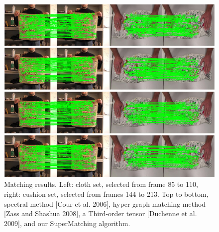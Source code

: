 \begin{figure}
\centering
  \includegraphics[width=1.05\linewidth]{figures/2DDeformable.jpg}
  \caption{Matching results. Left: cloth set, selected from frame 85 to 110, right: cushion set, selected from frames 144 to 213.
  Top to bottom, spectral method [Cour et al. 2006], hyper graph matching method [Zass and Shashua 2008], a Third-order tensor [Duchenne et al. 2009], and our SuperMatching algorithm.}
\label{fig:2DDeformable}
\end{figure}

